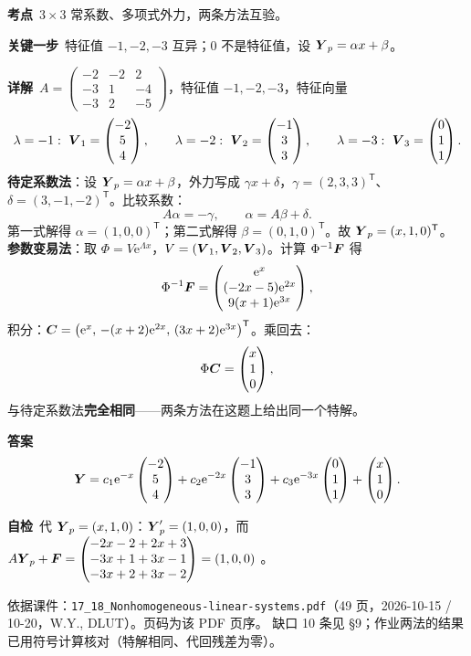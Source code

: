 \documentclass[11pt]{ctexart}
\renewcommand{\qbreak}{\needspace{0.26\textheight}}
\newcommand{\qpagebreak}{\needspace{0.92\textheight}}
\newcommand{\mat}[1]{\begin{pmatrix}#1\end{pmatrix}}
\begin{document}
\qpagebreak
{}
\label{app:hw}
\qbreak
{}
\par\textbf{考点}\ $3\times3$ 常系数、多项式外力，两条方法互验。
\par\textbf{关键一步}\ 特征值 $-1,-2,-3$ 互异；$0$ 不是特征值，设 $\boldsymbol{Y}_p=\alpha x+\beta$。
\par\textbf{详解}\ $A=\mat{-2&-2&2\\-3&1&-4\\-3&2&-5}$，特征值 $-1,-2,-3$，特征向量
\[
\lambda=-1:\ \vect{V}_1=\mat{-2\\5\\4},\qquad \lambda=-2:\ \vect{V}_2=\mat{-1\\3\\3},\qquad \lambda=-3:\ \vect{V}_3=\mat{0\\1\\1}.
\]
\textbf{待定系数法}：设 $\boldsymbol{Y}_p=\alpha x+\beta$，外力写成 $\gamma x+\delta$，$\gamma=(2,3,3)^{\mathsf T}$、$\delta=(3,-1,-2)^{\mathsf T}$。比较系数：
\[
A\alpha=-\gamma,\qquad \alpha=A\beta+\delta .
\]
第一式解得 $\alpha=(1,0,0)^{\mathsf T}$；第二式解得 $\beta=(0,1,0)^{\mathsf T}$。故 $\boldsymbol{Y}_p=(x,1,0)^{\mathsf T}$。
\textbf{参数变易法}：取 $\Phi=V\mathrm{e}^{\Lambda x}$，$V=(\boldsymbol{V}_1,\boldsymbol{V}_2,\boldsymbol{V}_3)$。计算 $\Phi^{-1}\boldsymbol{F}$ 得
\[
\Phi^{-1}\vect{F}=\mat{\mathrm{e}^{x}\\(-2x-5)\mathrm{e}^{2x}\\9(x+1)\mathrm{e}^{3x}},
\]
积分：$\boldsymbol{C}=\bigl(\mathrm{e}^x,\,-(x+2)\mathrm{e}^{2x},\,(3x+2)\mathrm{e}^{3x}\bigr)^{\mathsf T}$。乘回去：
\[
\Phi\vect{C}=\mat{x\\1\\0},
\]
与待定系数法\textbf{完全相同}——两条方法在这题上给出同一个特解。
\par\textbf{答案}\
\[
\vect{Y}=c_1\mathrm{e}^{-x}\mat{-2\\5\\4}+c_2\mathrm{e}^{-2x}\mat{-1\\3\\3}+c_3\mathrm{e}^{-3x}\mat{0\\1\\1}+\mat{x\\1\\0}.
\]
\par\textbf{自检}\ 代 $\boldsymbol{Y}_p=(x,1,0)$：$\boldsymbol{Y}_p'=(1,0,0)$，而 $A\vect{Y}_p+\vect{F}=\mat{-2x-2+2x+3\\-3x+1+3x-1\\-3x+2+3x-2}=(1,0,0)$ 。

\flowerrule

{\small\color{inkgray}
依据课件：\texttt{17\_18\_Nonhomogeneous-linear-systems.pdf}（49 页，2026-10-15 / 10-20，W.Y., DLUT）。页码为该 PDF 页序。
缺口 10 条见 §9；作业两法的结果已用符号计算核对（特解相同、代回残差为零）。}
\end{document}
